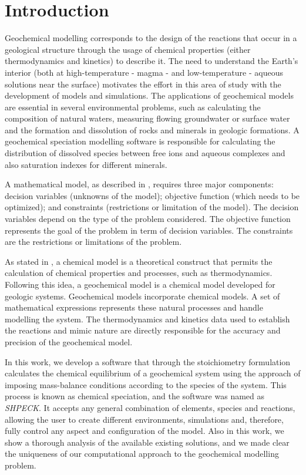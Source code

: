 \chapter{Introduction} 
\label{chapter:intro}


Geochemical modelling corresponds to the design of the reactions that occur in a geological structure through the usage of chemical properties (either thermodynamics and kinetics) to describe it. The need to understand the Earth's interior (both at high-temperature - magma - and low-temperature - aqueous solutions near the surface) motivates the effort in this area of study with the development of models and simulations. The applications of geochemical models are essential in several environmental problems, such as calculating the composition of natural waters, measuring flowing groundwater or surface water and the formation and dissolution of rocks and minerals in geologic formations. A geochemical speciation modelling software is responsible for calculating the distribution of dissolved species between free ions and aqueous complexes and also saturation indexes for different minerals. 


A mathematical model, as described in \cite{Sarker:08}, requires three major components: decision variables (unknowns of the model); objective function (which needs to be optimized); and constraints (restrictions or limitation of the model). 
The decision variables depend on the type of the problem considered.  The objective function represents the goal of the problem in term of decision variables. The constraints are the restrictions or limitations of the problem.

As stated in \cite{Drever:05}, a chemical model is a theoretical construct that permits the calculation of chemical properties and processes, such as thermodynamics. Following this idea, a geochemical model is a chemical model developed for geologic systems. Geochemical models incorporate chemical models. A set of mathematical expressions represents these natural processes and handle modelling the system. The thermodynamics and kinetics data used to establish the reactions and mimic nature are directly responsible for the accuracy and precision of the geochemical model.



In this work, we develop a software that through the stoichiometry formulation calculates the chemical equilibrium of a geochemical system using the approach of imposing mass-balance conditions according to the species of the system. This process is known as chemical speciation, and the software was named as \emph{SHPECK}. It accepts any general combination of elements, species and reactions, allowing the user to create different environments, simulations and, therefore, fully control any aspect and configuration of the model. Also in this work, we show a thorough analysis of the available existing solutions, and we made clear the uniqueness of our computational approach to the geochemical modelling problem. 

